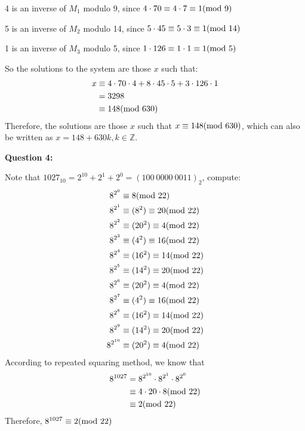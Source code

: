 \documentclass[a4paper,11pt]{article}
\begin{document}
\begin{spacing}{1.4}
    \hspace{1em} 4 is an inverse of $M_1$ modulo 9, since 
    $4\cdot 70\equiv 4\cdot 7\equiv 1 {\rm (mod\ 9)}$

    \hspace{1em} 5 is an inverse of $M_2$ modulo 14, since 
    $5\cdot 45\equiv 5\cdot 3\equiv 1{\rm (mod\ 14)}$

    \hspace{1em} 1 is an inverse of $M_3$ modulo 5, since 
    $1\cdot 126\equiv 1\cdot 1\equiv 1{\rm (mod\ 5)}$

    So the solutions to the system are those $x$ such that:
    \begin{align*}
        x&\equiv 4\cdot 70\cdot 4+ 8\cdot 45\cdot 5
        + 3 \cdot 126 \cdot 1\\
        &=3298\\
        &\equiv 148{\rm (mod\ 630)}
    \end{align*}
    Therefore, the solutions are those $x$ such that
    $x\equiv 148{\rm (mod\ 630)}$, which can also be written as
    $x=148+630k, k\in \mathbb{Z}$.



    \newpage
    \textbf{Question 4:}

    Note that $1027_{10}=2^{10}+2^1+2^0=(100\ 0000\ 0011)_2$,
    compute:
    \begin{align*}
        8^{2^0}&\equiv 8 {\rm (mod\ 22)}\\
        8^{2^1}&\equiv (8^2)\equiv 20 {\rm (mod\ 22)}\\
        8^{2^2}&\equiv (20^2)\equiv 4 {\rm (mod\ 22)}\\
        8^{2^3}&\equiv (4^2)\equiv 16 {\rm (mod\ 22)}\\
        8^{2^4}&\equiv (16^2)\equiv 14 {\rm (mod\ 22)}\\
        8^{2^5}&\equiv (14^2)\equiv 20 {\rm (mod\ 22)}\\
        8^{2^6}&\equiv (20^2)\equiv 4 {\rm (mod\ 22)}\\
        8^{2^7}&\equiv (4^2)\equiv 16 {\rm (mod\ 22)}\\
        8^{2^8}&\equiv (16^2)\equiv 14 {\rm (mod\ 22)}\\
        8^{2^9}&\equiv (14^2)\equiv 20 {\rm (mod\ 22)}\\
        8^{2^{10}}&\equiv (20^2)\equiv 4 {\rm (mod\ 22)}
    \end{align*}
    According to repeated squaring method, we know that
    \begin{align*}
        8^{1027}&=8^{2^{10}}\cdot 8^{2^1}\cdot 8^{2^0}\\
        &\equiv 4\cdot 20\cdot 8 {\rm (mod\ 22)}\\
        &\equiv 2 {\rm (mod\ 22)}
    \end{align*}
    Therefore, $8^{1027}\equiv 2 {\rm (mod\ 22)}$
    


\end{spacing}
\end{document}
